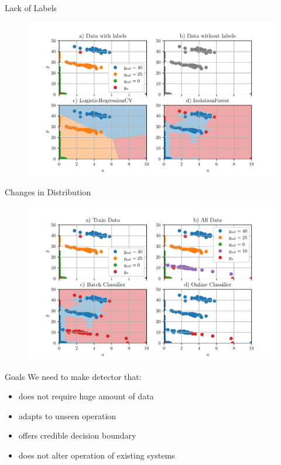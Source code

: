 \documentclass[aspectratio=169]{beamer}
\begin{document}
\begin{frame}{Lack of Labels}
    \begin{figure}[htpb]
        \begin{center}
            \includegraphics[width=0.75\linewidth]{../ilustrate/pc2023/un_supervised.pdf}
        \end{center}
    \end{figure}
\end{frame}

\begin{frame}{Changes in Distribution}
    \begin{figure}[htpb]
        \begin{center}
            \includegraphics[width=0.75\linewidth]{../ilustrate/pc2023/online_freeze.pdf}
        \end{center}
    \end{figure}
\end{frame}

\begin{frame}{Goals}
    We need to make detector that:
    \begin{itemize}
        \item does not require huge amount of data
        \item adapts to unseen operation
        \item offers credible decision boundary
        \item does not alter operation of existing systems
    \end{itemize}
\end{frame}
\end{document}

